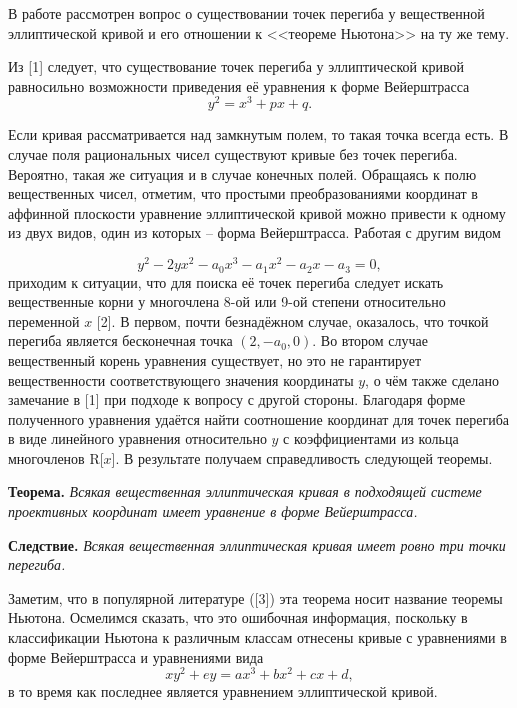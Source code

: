 
\vzmscaption

В работе рассмотрен вопрос о существовании точек перегиба у вещественной эллиптической кривой
и его отношении к <<теореме Ньютона>> на ту же тему.

Из [1] следует, что существование точек перегиба у эллиптической кривой равносильно возможности приведения её уравнения к форме Вейерштрасса
$$y^2=x^3+px+q.$$

Если кривая рассматривается над замкнутым полем, то такая точка всегда есть. В случае поля рациональных чисел существуют кривые без точек перегиба. Вероятно, такая же ситуация и в случае конечных полей. Обращаясь к полю вещественных чисел, отметим, что простыми преобразованиями координат в аффинной плоскости уравнение эллиптической кривой можно привести к одному из двух видов, один из которых -- форма Вейерштрасса. Работая с другим видом

$$y^2-2yx^2-a_0x^3-a_1x^2-a_2x-a_3=0,$$
приходим к ситуации, что для поиска её точек перегиба следует искать вещественные корни у многочлена 8-ой или 9-ой степени относительно переменной  $x$ [2]. В первом, почти безнадёжном случае, оказалось, что точкой перегиба является бесконечная точка $(2, - a_0, 0).$ Во втором случае вещественный корень уравнения существует, но это не гарантирует вещественности соответствующего значения координаты $y$, о чём также сделано замечание в [1] при подходе к вопросу с другой стороны. Благодаря форме полученного уравнения удаётся найти соотношение координат для точек перегиба в виде линейного уравнения относительно $y$ с коэффициентами из кольца многочленов R[$x$]. В результате получаем справедливость следующей теоремы.

\textbf{Теорема.} {\it Всякая вещественная эллиптическая кривая в подходящей системе проективных координат имеет ура\-в\-не\-ние в форме Вейерштрасса.}

\textbf{Следствие.} {\it Всякая вещественная эллиптическая кривая имеет ровно три точки перегиба.}

Заметим, что в популярной литературе ([3]) эта теорема носит название теоремы Ньютона. Осмелимся сказать, что это ошибочная информация, поскольку в классификации Ньютона к различным классам отнесены кривые с уравнениями в форме Вейерштрасса и уравнениями вида
$$xy^2+ey=ax^3+bx^2+cx+d,$$
в то время как последнее является уравнением эллиптической кривой.




